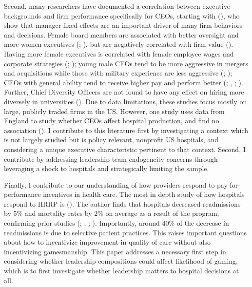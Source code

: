 \documentclass[12pt]{article}
\begin{document}
    Second, many researchers have documented a correlation between executive backgrounds and firm performance specifically for CEOs, starting with \citeauthor{bertrand2003managing} (\citeyear{bertrand2003managing}), who show that manager fixed effects are an important driver of many firm behaviors and decisions. Female board members are associated with better oversight and more women executives (\cite{matsa2011chipping}; \cite{adams2009women}), but are negatively correlated with firm value (\cite{ahern2012changing}). Having more female executives is correlated with female employee wages and corporate strategies (\cite{flabbi2019female}; \cite{matsa2013female}); young male CEOs tend to be more aggressive in mergers and acquisitions while those with military experience are less aggressive (\cite{levi2010deal}; \cite{benmelech2015military}); CEOs with general ability tend to receive higher pay and perform better (\cite{kaplan2012ceo}; \cite{custodio2013generalists}, \cite{adams2018director}; \cite{frydman2019rising}). Further, Chief Diversity Officers are not found to have any effect on hiring more diversely in universities (\cite{bradley2022impact}). Due to data limitations, these studies focus mostly on large, publicly traded firms in the US. However, one study uses data from England to study whether CEOs affect hospital production, and find no association (\cite{janke2019impact}). I contribute to this literature first by investigating a context which is not largely studied but is policy relevant, nonprofit US hospitals, and considering a unique executive characteristic pertinent to that context. Second, I contribute by addressing leadership team endogeneity concerns through leveraging a shock to hospitals and strategically limiting the sample. 

    Finally, I contribute to our understanding of how providers respond to pay-for-performance incentives in health care. The most in depth study of how hospitals respond to HRRP is \citeauthor{gupta2021impacts} (\citeyear{gupta2021impacts}). The author finds that hospitals decreased readmissions by 5\% and mortality rates by 2\% on average as a result of the program, confirming prior studies (\cite{mellor2017does}; \cite{ziedan2018essays}; \cite{ody2019decreases}; \cite{gupta2021impacts}). Importantly, around 40\% of the decrease in readmissions is due to selective patient practices. This raises important questions about how to incentivize improvement in quality of care without also incentivizing gamesmanship. This paper addresses a necessary first step in considering whether leadership compositions could affect likelihood of gaming, which is to first investigate whether leadership matters to hospital decisions at all. 
\end{document}
